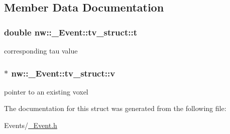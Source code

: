 \subsection{Member Data Documentation}
\hypertarget{structnw_1_1___event_1_1tv__struct_a60486108e732f06bdb4bc5775e875c37}{
\subsubsection[{t}]{\setlength{\rightskip}{0pt plus 5cm}double nw\+::\+\_\+\+Event\+::tv\+\_\+struct\+::t}}\label{structnw_1_1___event_1_1tv__struct_a60486108e732f06bdb4bc5775e875c37}


corresponding tau value 

\hypertarget{structnw_1_1___event_1_1tv__struct_af3cef61890dbf9b568baad7c2532ed56}{
\subsubsection[{v}]{$\ast$ nw\+::\+\_\+\+Event\+::tv\+\_\+struct\+::v}}\label{structnw_1_1___event_1_1tv__struct_af3cef61890dbf9b568baad7c2532ed56}


pointer to an existing voxel 



The documentation for this struct was generated from the following file\+:\begin{DoxyCompactItemize}
\item 
Events/\hyperlink{___event_8h}{\+\_\+\+Event.\+h}\end{DoxyCompactItemize}
